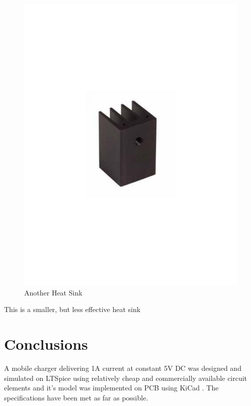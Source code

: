 \documentclass{article}
\begin{document}
\begin{figure}[h!]
\centerline{\includegraphics[scale=.25]{Images/heat-sink-pi49-500x500.jpg}}
\caption{Another Heat Sink}
\label{figb}
\end{figure}

This is a smaller, but less effective heat sink\cite{noauthor_heat_nodate}

\newpage
\section{Conclusions}

A mobile charger delivering 1A current at constant 5V DC was designed and simulated on LTSpice using relatively cheap and commercially available circuit elements and it's model was implemented on PCB using KiCad . The specifications have been met as far as possible.



\printbibliography
\end{document}
